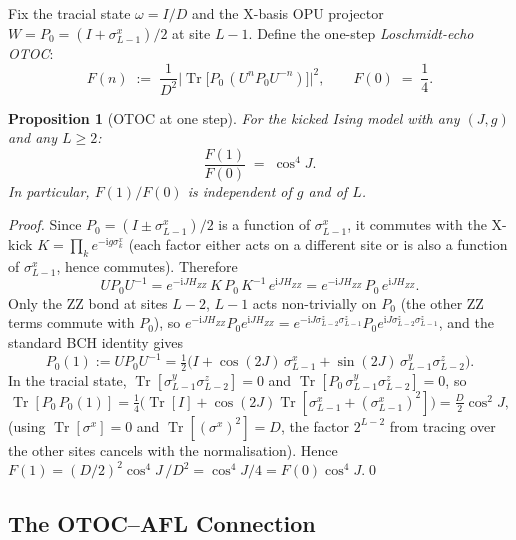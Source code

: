 \documentclass[12pt,a4paper]{article}
\newtheorem{proposition}[theorem]{Proposition}
\begin{document}
Fix the tracial state $\omega = I/D$ and the X-basis OPU projector
$W = P_0 = (I+\sigma^x_{L-1})/2$ at site $L-1$.  Define the one-step
\emph{Loschmidt-echo OTOC}:
\begin{equation}\label{eq:otoc_def}
  F(n) \;:=\;
  \frac{1}{D^2}\bigl|\operatorname{Tr}\bigl[P_0\,(U^n P_0 U^{-n})\bigr]\bigr|^2,
  \qquad
  F(0) \;=\; \frac{1}{4}.
\end{equation}

\begin{proposition}[OTOC at one step]\label{prop:otoc1}
For the kicked Ising model with any $(J,g)$ and any $L\ge 2$:
\begin{equation}\label{eq:otoc1}
  \frac{F(1)}{F(0)} \;=\; \cos^4\!J.
\end{equation}
In particular, $F(1)/F(0)$ is independent of $g$ and of $L$.
\end{proposition}

\begin{proof}
Since $P_0 = (I\pm\sigma^x_{L-1})/2$ is a function of $\sigma^x_{L-1}$, it commutes
with the X-kick $K = \prod_k e^{-\mathrm{i}g\sigma^x_k}$ (each factor either acts
on a different site or is also a function of $\sigma^x_{L-1}$, hence commutes).
Therefore
\[
  U P_0 U^{-1}
  = e^{-\mathrm{i}J H_{ZZ}}\,K\,P_0\,K^{-1}\,e^{\mathrm{i}J H_{ZZ}}
  = e^{-\mathrm{i}J H_{ZZ}}\,P_0\,e^{\mathrm{i}J H_{ZZ}}.
\]
Only the ZZ bond at sites $L-2$, $L-1$ acts non-trivially on $P_0$ (the other
ZZ terms commute with $P_0$), so
$e^{-\mathrm{i}J H_{ZZ}} P_0 e^{\mathrm{i}J H_{ZZ}} = e^{-\mathrm{i}J\sigma^z_{L-2}\sigma^z_{L-1}} P_0 e^{\mathrm{i}J\sigma^z_{L-2}\sigma^z_{L-1}}$,
and the standard BCH identity gives
\[
  P_0(1) := U P_0 U^{-1}
  = \tfrac{1}{2}\bigl(I + \cos(2J)\,\sigma^x_{L-1}
                      + \sin(2J)\,\sigma^y_{L-1}\sigma^z_{L-2}\bigr).
\]
In the tracial state, $\operatorname{Tr}[\sigma^y_{L-1}\sigma^z_{L-2}] = 0$ and
$\operatorname{Tr}[P_0\,\sigma^y_{L-1}\sigma^z_{L-2}] = 0$, so
\[
  \operatorname{Tr}[P_0\,P_0(1)]
  = \tfrac{1}{4}\bigl(\operatorname{Tr}[I] + \cos(2J)\operatorname{Tr}[\sigma^x_{L-1}+(\sigma^x_{L-1})^2]\bigr)
  = \tfrac{D}{2}\cos^2\!J,
\]
(using $\operatorname{Tr}[\sigma^x] = 0$ and $\operatorname{Tr}[(\sigma^x)^2]=D$, the factor
$2^{L-2}$ from tracing over the other sites cancels with the normalisation).
Hence
$F(1) = (D/2)^2\cos^4\!J\,/D^2 = \cos^4\!J/4 = F(0)\cos^4\!J$.\qed
\end{proof}

\subsection{The OTOC–AFL Connection}
\end{document}
